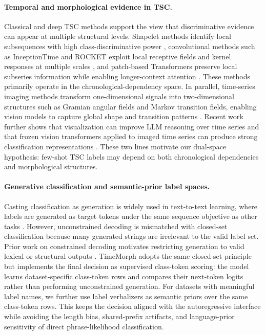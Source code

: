 \documentclass{article}
\begin{document}
\paragraph{Temporal and morphological evidence in TSC.}
Classical and deep TSC methods support the view that discriminative evidence can appear at multiple structural levels. Shapelet methods identify local subsequences with high class-discriminative power \cite{ye2009shapelets,tang2020interpretable}, convolutional methods such as InceptionTime and ROCKET exploit local receptive fields and kernel responses at multiple scales \cite{fawaz2020inceptiontime,dempster2020rocket}, and patch-based Transformers preserve local subseries information while enabling longer-context attention \cite{nietime}. These methods primarily operate in the chronological-dependency space. In parallel, time-series imaging methods transform one-dimensional signals into two-dimensional structures such as Gramian angular fields and Markov transition fields, enabling vision models to capture global shape and transition patterns \cite{wang2015imaging}. Recent work further shows that visualization can improve LLM reasoning over time series and that frozen vision transformers applied to imaged time series can produce strong classification representations \cite{liu2025picture,roschmann2025time}. These two lines motivate our dual-space hypothesis: few-shot TSC labels may depend on both chronological dependencies and morphological structures.

\paragraph{Generative classification and semantic-prior label spaces.}
Casting classification as generation is widely used in text-to-text learning, where labels are generated as target tokens under the same sequence objective as other tasks \cite{raffel2020exploring}. However, unconstrained decoding is mismatched with closed-set classification because many generated strings are irrelevant to the valid label set. Prior work on constrained decoding motivates restricting generation to valid lexical or structural outputs \cite{hokamp2017lexically,koo2024automata}. TimeMorph adopts the same closed-set principle but implements the final decision as supervised class-token scoring: the model learns dataset-specific class-token rows and compares their next-token logits rather than performing unconstrained generation. For datasets with meaningful label names, we further use label verbalizers as semantic priors over the same class-token rows. This keeps the decision aligned with the autoregressive interface while avoiding the length bias, shared-prefix artifacts, and language-prior sensitivity of direct phrase-likelihood classification.
\end{document}
